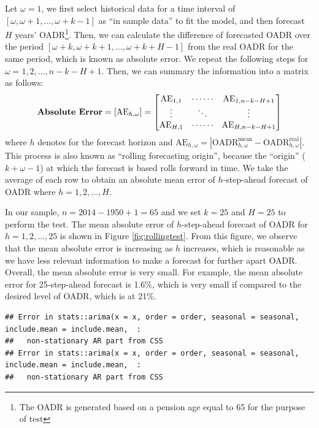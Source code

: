 \documentclass[11pt,a4paper,]{article}
\begin{document}
Let \(\omega=1\), we first select historical data for a time interval of \([\omega,\omega+1,\dots,\omega+k-1]\) as ``in sample data'' to fit the model, and then forecast \(H\) years' OADR\footnote{The OADR is generated based on a pension age equal to 65 for the purpose of test}. Then, we can calculate the difference of forecasted OADR over the period \([\omega+k,\omega+k+1,\dots,\omega+k+H-1]\) from the real OADR for the same period, which is known as absolute error. We repeat the following steps for \(\omega=1,2,\dots,n-k-H+1\). Then, we can summary the information into a matrix as follows:
\begin{equation*}
  \text{\textbf{Absolute Error}} = [\text{AE}_{h,\omega}] =
    \begin{bmatrix}
      \text{AE}_{1,1} & \cdots\cdots & \text{AE}_{1,n-k-H+1} \\
      \vdots          & \ddots       & \vdots \\
      \text{AE}_{H,1} & \cdots\cdots & \text{AE}_{H,n-k-H+1}
    \end{bmatrix}
\end{equation*}
where \(h\) denotes for the forecast horizon and \(\text{AE}_{h,\omega}=\left|\text{OADR}^{\text{mean}}_{h,\omega}-\text{OADR}^{\text{real}}_{h,\omega}\right|\). This process is also known as ``rolling forecasting origin'', because the ``origin'' (\(k+\omega-1\)) at which the forecast is based rolls forward in time. We take the average of each row to obtain an absolute mean error of \(h\)-step-ahead forecast of OADR where \(h=1,2,\dots,H\).

In our sample, \(n=2014-1950+1=65\) and we set \(k=25\) and \(H=25\) to perform the test. The mean absolute error of \(h\)-step-ahead forecast of OADR for \(h=1,2,\dots,25\) is shown in Figure \ref{fig:rollingtest}. From this figure, we observe that the mean absolute error is increasing as \(h\) increases, which is reasonable as we have less relevant information to make a forecast for further apart OADR. Overall, the mean absolute error is very small. For example, the mean absolute error for 25-step-ahead forecast is 1.6\%, which is very small if compared to the desired level of OADR, which is at 21\%.

\begin{verbatim}
## Error in stats::arima(x = x, order = order, seasonal = seasonal, include.mean = include.mean,  : 
##   non-stationary AR part from CSS
## Error in stats::arima(x = x, order = order, seasonal = seasonal, include.mean = include.mean,  : 
##   non-stationary AR part from CSS
\end{verbatim}
\end{document}
